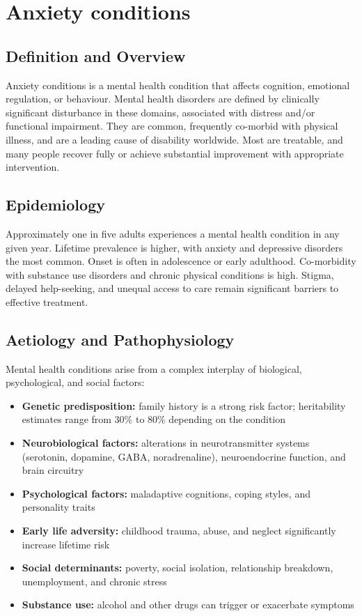 \chapter{Anxiety conditions}

\section*{Definition and Overview}
Anxiety conditions is a mental health condition that affects cognition, emotional regulation, or behaviour. Mental health disorders are defined by clinically significant disturbance in these domains, associated with distress and/or functional impairment. They are common, frequently co-morbid with physical illness, and are a leading cause of disability worldwide. Most are treatable, and many people recover fully or achieve substantial improvement with appropriate intervention.

\section*{Epidemiology}
Approximately one in five adults experiences a mental health condition in any given year. Lifetime prevalence is higher, with anxiety and depressive disorders the most common. Onset is often in adolescence or early adulthood. Co-morbidity with substance use disorders and chronic physical conditions is high. Stigma, delayed help-seeking, and unequal access to care remain significant barriers to effective treatment.

\section*{Aetiology and Pathophysiology}
Mental health conditions arise from a complex interplay of biological, psychological, and social factors:

\begin{itemize}
    \item \textbf{Genetic predisposition:} family history is a strong risk factor; heritability estimates range from 30\% to 80\% depending on the condition
    \item \textbf{Neurobiological factors:} alterations in neurotransmitter systems (serotonin, dopamine, GABA, noradrenaline), neuroendocrine function, and brain circuitry
    \item \textbf{Psychological factors:} maladaptive cognitions, coping styles, and personality traits
    \item \textbf{Early life adversity:} childhood trauma, abuse, and neglect significantly increase lifetime risk
    \item \textbf{Social determinants:} poverty, social isolation, relationship breakdown, unemployment, and chronic stress
    \item \textbf{Substance use:} alcohol and other drugs can trigger or exacerbate symptoms
\end{itemize}

